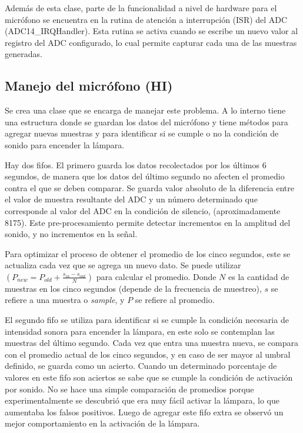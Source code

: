 Además de esta clase, parte de la funcionalidad a nivel de hardware para el micrófono se encuentra
en la rutina de atención a interrupción (ISR) del ADC (ADC14\_IRQHandler). Esta rutina se activa
cuando se escribe un nuevo valor al registro del ADC configurado, lo cual permite capturar cada una
de las muestras generadas.

\subsection{Manejo del micrófono (HI)}

Se crea una clase que se encarga de manejar este problema. A lo interno tiene una estructura donde
se guardan los datos del micrófono y tiene métodos para agregar nuevas muestras y para identificar
si se cumple o no la condición de sonido para encender la lámpara.

Hay dos fifos. El primero guarda los datos recolectados por los últimos 6 segundos, de manera que
los datos del último segundo no afecten el promedio contra el que se deben comparar. Se guarda valor
absoluto de la diferencia entre el valor de muestra resultante del ADC y un número determinado que
corresponde al valor del ADC en la condición de silencio, (aproximadamente 8175). Este
pre-procesamiento permite detectar incrementos en la amplitud del sonido, y no incrementos en la
señal.

Para optimizar el proceso de obtener el promedio de los cinco segundos, este se actualiza cada vez
que se agrega un nuevo dato. Se puede utilizar
$\left(P_{new} = P_{old}+\frac{s_{in}-s_{out}}{N}\right)$ para calcular el promedio. Donde $N$ es la
cantidad de muestras en los cinco segundos (depende de la frecuencia de muestreo), $s$ se refiere a
una muestra o \textit{sample}, y $P$ se refiere al promedio.

El segundo fifo se utiliza para identificar si se cumple la condición necesaria de intensidad sonora
para encender la lámpara, en este solo se contemplan las muestras del último segundo.  Cada vez que
entra una muestra nueva, se compara con el promedio actual de los cinco segundos, y en caso de ser
mayor al umbral definido, se guarda como un acierto. Cuando un determinado porcentaje de valores en
este fifo son aciertos se sabe que se cumple la condición de activación por sonido. No se
hace una simple comparación de promedios porque experimentalmente se descubrió que era muy fácil
activar la lámpara, lo que aumentaba los falsos positivos. Luego de agregar este fifo extra se
observó un mejor comportamiento en la activación de la lámpara.


